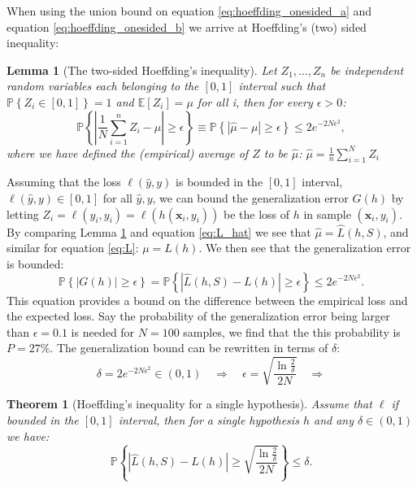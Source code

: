 \documentclass[a4paper, twoside, nobib]{tufte-book}
\newtheorem{lemma}{Lemma}
\newtheorem{theorem}{Theorem}
\renewcommand{\vec}[1]{\mathbf{#1}}
\begin{document}
When using the union bound on equation \eqref{eq:hoeffding_onesided_a} and equation \eqref{eq:hoeffding_onesided_b} we arrive at Hoeffding's (two) sided inequality:
\begin{lemma}[The two-sided Hoeffding's inequality]
  \label{lemma:hoeffding}
  Let $Z_1, \dots, Z_n$ be independent random variables each belonging to the $[0, 1]$ interval such that $\mathbb{P}\left\{Z_i \in [0, 1] \right\} = 1$ and $\mathbb{E}[Z_i] = \mu$ for all i, then for every $\epsilon > 0$:
  \begin{equation}
    \mathbb{P} \left\{ \left| \frac{1}{N}\sum_{i=1}^n Z_i - \mu \right| \geq \epsilon \right\} \equiv \mathbb{P} \left\{ \left| \hat{\mu} - \mu \right| \geq \epsilon \right\} \leq 2 e^{-2N\epsilon^2},
    \label{eq:hoeffding_inequality}
  \end{equation}
  where we have defined the (empirical) average of $Z$ to be $\hat{\mu}$: $\hat{\mu}=\frac{1}{n}\sum_{i=1}^N Z_i $
\end{lemma}
Assuming that the loss $\ell(\hat{y}, y)$ is bounded in the $[0, 1]$ interval, $\ell(\hat{y}, y) \in [0, 1]$ for all $\hat{y}, y$, we can bound the generalization error $G(h)$ by letting $Z_i = \ell(\hat{y}_i, y_i) = \ell(h(\vec{x}_i, y_i))$ be the loss of $h$ in sample $(\vec{x}_i, y_i)$. By comparing Lemma \ref{lemma:hoeffding} and equation \eqref{eq:L_hat} we see that $\hat{\mu} = \hat{L}(h, S)$, and similar for equation \eqref{eq:L}: $\mu = L(h)$. We then see that the generalization error is bounded:
\begin{equation}
  \label{eq:hoeffding_inequality_generalization_error}
  \mathbb{P} \left\{ \left| G(h) \right| \geq \epsilon \right\} = \mathbb{P} \left\{ \left| \hat{L}(h, S) - L(h) \right| \geq \epsilon \right\} \leq 2 e^{-2N\epsilon^2}.
\end{equation}
This equation provides a bound on the difference between the empirical loss and the expected loss. Say the probability of the generalization error being larger than $\epsilon = 0.1$ is needed for $N=100$ samples, we find that the this probability is $P=27\%$. The generalization bound  can be rewritten in terms of $\delta$:
\begin{equation}
  \delta = 2 e^{-2N\epsilon^2} \in (0, 1) \quad \Rightarrow \quad \epsilon = \sqrt{\frac{\ln \frac{2}{\delta}}{2N}} \quad \Rightarrow
\end{equation}
\begin{theorem}[Hoeffding's inequality for a single hypothesis]
  \label{theorem:hoeffding_single}
  Assume that $\ell$ if bounded in the $[0, 1]$ interval, then for a single hypothesis $h$ and any $\delta\in(0,1)$ we have:  
  \begin{equation}
    \label{eq:hoeffding_inequality_generalization_error_delta}
    \mathbb{P} \left\{ \left| \hat{L}(h, S) - L(h) \right| \geq \sqrt{\frac{\ln \frac{2}{\delta}}{2N}}  \right\} \leq \delta.
  \end{equation}
\end{theorem}
\end{document}
